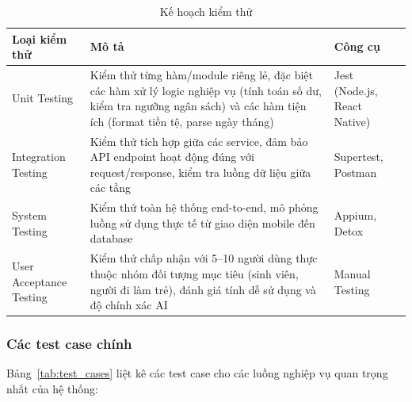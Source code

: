 \begin{table}[htbp]
\centering
\begin{tabularx}{\textwidth}{|l|X|l|}
\hline
\textbf{Loại kiểm thử} & \textbf{Mô tả} & \textbf{Công cụ} \\ \hline
Unit Testing & Kiểm thử từng hàm/module riêng lẻ, đặc biệt các hàm xử lý logic nghiệp vụ (tính toán số dư, kiểm tra ngưỡng ngân sách) và các hàm tiện ích (format tiền tệ, parse ngày tháng) & Jest (Node.js, React Native) \\ \hline
Integration Testing & Kiểm thử tích hợp giữa các service, đảm bảo API endpoint hoạt động đúng với request/response, kiểm tra luồng dữ liệu giữa các tầng & Supertest, Postman \\ \hline
System Testing & Kiểm thử toàn hệ thống end-to-end, mô phỏng luồng sử dụng thực tế từ giao diện mobile đến database & Appium, Detox \\ \hline
User Acceptance Testing & Kiểm thử chấp nhận với 5--10 người dùng thực thuộc nhóm đối tượng mục tiêu (sinh viên, người đi làm trẻ), đánh giá tính dễ sử dụng và độ chính xác AI & Manual Testing \\ \hline
\end{tabularx}
\caption{Kế hoạch kiểm thử}
\label{tab:test_plan}
\end{table}

\subsubsection{Các test case chính}

Bảng~\ref{tab:test_cases} liệt kê các test case cho các luồng nghiệp vụ quan trọng nhất của hệ thống:

